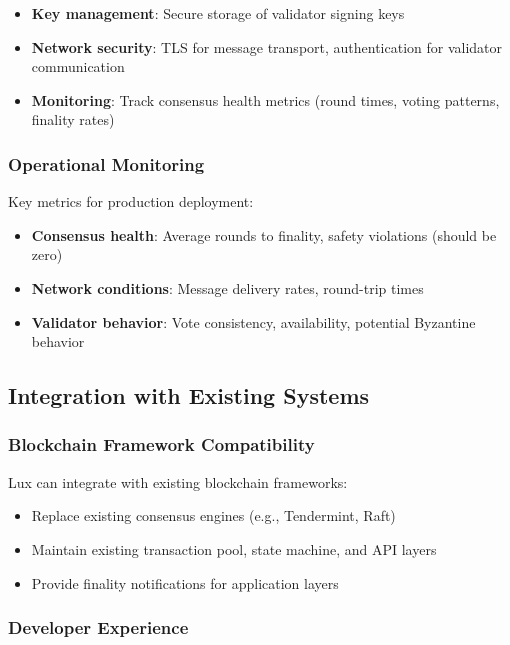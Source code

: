 \begin{itemize}
\item \textbf{Key management}: Secure storage of validator signing keys
\item \textbf{Network security}: TLS for message transport, authentication for validator communication  
\item \textbf{Monitoring}: Track consensus health metrics (round times, voting patterns, finality rates)
\end{itemize}

\subsubsection{Operational Monitoring}

Key metrics for production deployment:
\begin{itemize}
\item \textbf{Consensus health}: Average rounds to finality, safety violations (should be zero)
\item \textbf{Network conditions}: Message delivery rates, round-trip times
\item \textbf{Validator behavior}: Vote consistency, availability, potential Byzantine behavior
\end{itemize}

\subsection{Integration with Existing Systems}

\subsubsection{Blockchain Framework Compatibility}

Lux can integrate with existing blockchain frameworks:
\begin{itemize}
\item Replace existing consensus engines (e.g., Tendermint, Raft)
\item Maintain existing transaction pool, state machine, and API layers
\item Provide finality notifications for application layers
\end{itemize}

\subsubsection{Developer Experience}

